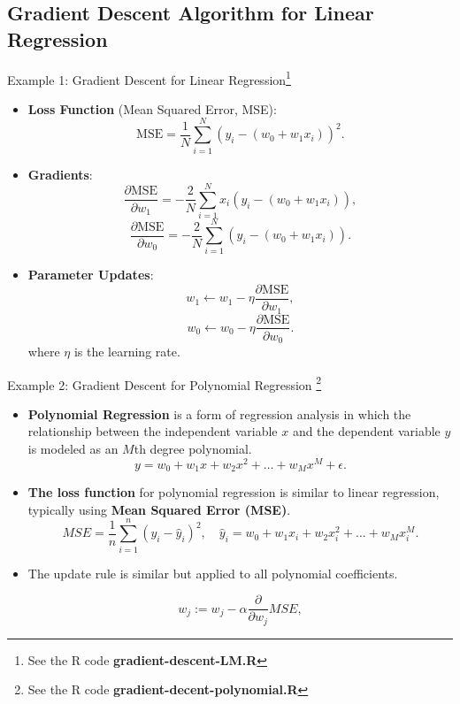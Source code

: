 \documentclass[10pt, hyperref={colorlinks = true,linkcolor = blue}]{beamer}
\begin{document}
{{}
{\subsection{Gradient Descent Algorithm for Linear Regression}
\begin{frame}{Example 1: Gradient Descent for Linear Regression\footnote{See the R code \textbf{gradient-descent-LM.R}}}
 \begin{itemize}[<+->]
        \item \textbf{Loss Function} (Mean Squared Error, MSE):
        \[
        \text{MSE} = \frac{1}{N} \sum_{i=1}^{N} (y_i - (w_0 + w_1 x_i))^2.
        \]
        \item \textbf{Gradients}:
        \[
        \frac{\partial \text{MSE}}{\partial w_1} = -\frac{2}{N} \sum_{i=1}^{N} x_i (y_i - (w_0   + w_1 x_i)),
        \]
        \[
        \frac{\partial \text{MSE}}{\partial w_0} = -\frac{2}{N} \sum_{i=1}^{N} (y_i - (w_0+ w_1 x_i)).
        \]
        \item \textbf{Parameter Updates}:
        \[
        w_1 \leftarrow w_1 - \eta \frac{\partial \text{MSE}}{\partial w_1},
        \]
        \[
        w_0 \leftarrow w_0 - \eta \frac{\partial \text{MSE}}{\partial w_0}.
        \]
        where \( \eta \) is the learning rate.
    \end{itemize}
    
\end{frame}

\begin{frame}{Example 2: Gradient Descent for Polynomial Regression \footnote{See the R code \textbf{gradient-decent-polynomial.R}}}
 \begin{itemize}[<+->]
\item \textbf{Polynomial Regression} is a form of regression analysis in which the relationship between the independent variable \(x\) and the dependent variable \(y\) is modeled as an \(M\)th degree polynomial.
\[
y = w_0 + w_1 x + w_2 x^2 + \ldots + w_M x^M + \epsilon.
\]
\item \textbf{The loss function} for polynomial regression is similar to linear regression, typically using \textbf{Mean Squared Error (MSE)}.
\[
MSE = \frac{1}{n} \sum_{i=1}^{n} (y_i - \hat{y}_i)^2, \quad 
\hat{y}_i = w_0 + w_1 x_i + w_2 x_i^2 + \ldots + w_M x_i^M.
\]
\item The update rule is similar but applied to all polynomial coefficients.

\[
w_j := w_j - \alpha \frac{\partial}{\partial w_j} MSE,
\]


\end{itemize}
\end{frame}}}
\end{document}
